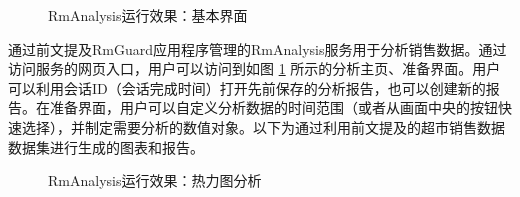\begin{figure}[htbp]
    \centering
	\caption{RmAnalysis运行效果：基本界面}
	\label{fig:aly-core}
\end{figure}

通过前文提及RmGuard应用程序管理的RmAnalysis服务用于分析销售数据。通过访问服务的网页入口，用户可以访问到如图 \ref{fig:aly-core} 所示的分析主页、准备界面。用户可以利用会话ID（会话完成时间）打开先前保存的分析报告，也可以创建新的报告。在准备界面，用户可以自定义分析数据的时间范围（或者从画面中央的按钮快速选择），并制定需要分析的数值对象。以下为通过利用前文提及的超市销售数据数据集进行生成的图表和报告。

\begin{figure}[htbp]
	\caption{RmAnalysis运行效果：热力图分析}
	\label{fig:aly-demo-a}
\end{figure}

